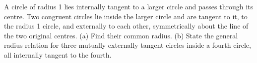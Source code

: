 A circle of radius 1 lies internally tangent to a larger circle and passes through its centre. Two congruent circles lie inside the larger circle and are tangent to it, to the radius 1 circle, and externally to each other, symmetrically about the line of the two original centres. (a) Find their common radius. (b) State the general radius relation for three mutually externally tangent circles inside a fourth circle, all internally tangent to the fourth.
